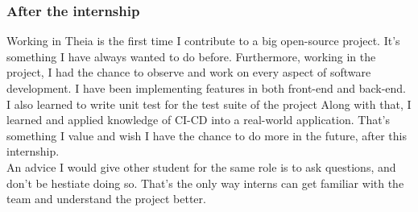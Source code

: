 \subsubsection{After the internship}
Working in Theia is the first time I contribute to a big open-source project.
It's something I have always wanted to do before. 
Furthermore, working in the project, I had the chance to observe and work on every aspect of software development.
I have been implementing features in both front-end and back-end.
I also learned to write unit test for the test suite of the project
Along with that, I learned and applied knowledge of CI-CD into a real-world application.
That's something I value and wish I have the chance to do more in the future, after this internship. 
\\
An advice I would give other student for the same role is to ask questions, and don't be hestiate doing so.
That's the only way interns can get familiar with the team and understand the project better.
\\





